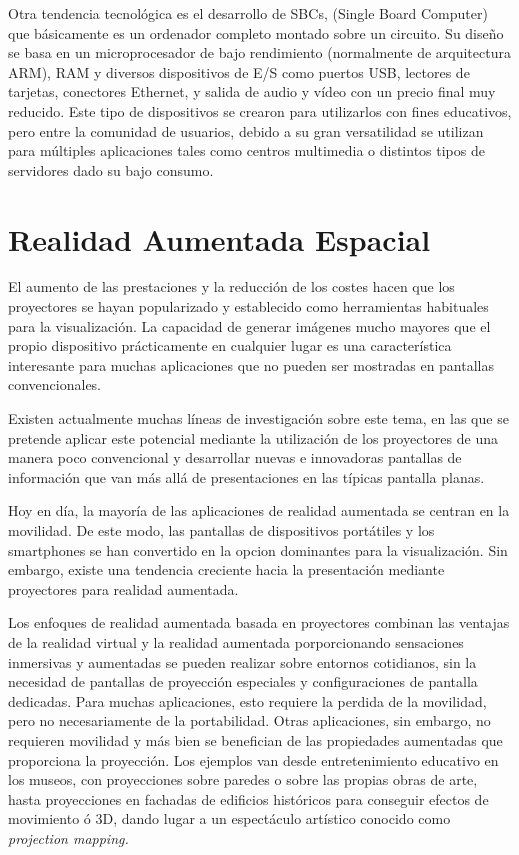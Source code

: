 Otra tendencia tecnológica es el desarrollo de SBCs, (Single Board Computer) que básicamente es un ordenador completo montado sobre un circuito. Su diseño se basa en un microprocesador de bajo rendimiento (normalmente de arquitectura ARM), RAM y diversos dispositivos de E/S como puertos USB, lectores de tarjetas, conectores Ethernet, y salida de audio y vídeo con un precio final muy reducido. Este tipo de dispositivos se crearon para utilizarlos con fines educativos, pero entre la comunidad de usuarios, debido a su gran versatilidad se utilizan para múltiples aplicaciones tales como centros multimedia o distintos tipos de servidores dado su bajo consumo.  

  \section{Realidad Aumentada Espacial}
  El aumento de las prestaciones y la reducción de los costes hacen que los proyectores se hayan popularizado y establecido como herramientas habituales para la visualización. La capacidad de generar imágenes mucho mayores que el propio dispositivo prácticamente en cualquier lugar es una característica interesante para muchas aplicaciones que no pueden ser mostradas en pantallas convencionales. 

Existen actualmente muchas líneas de investigación sobre este tema, en las que se pretende aplicar este potencial mediante la utilización de los proyectores de una manera poco convencional y desarrollar nuevas e innovadoras pantallas de información que van más allá de presentaciones en las típicas pantalla planas.
 

Hoy en día, la mayoría de las aplicaciones de realidad aumentada se centran en la movilidad. De este modo, las pantallas de dispositivos portátiles y los smartphones se han convertido en la opcion dominantes para la visualización. Sin embargo, existe una tendencia creciente hacia la presentación mediante proyectores para realidad aumentada. 

Los enfoques de realidad aumentada basada en proyectores combinan las ventajas de la realidad virtual y la realidad aumentada porporcionando sensaciones inmersivas y aumentadas se pueden realizar sobre entornos cotidianos, sin la necesidad de pantallas de proyección especiales y configuraciones de pantalla dedicadas. Para muchas aplicaciones, esto requiere la perdida de la movilidad, pero no necesariamente de la portabilidad. Otras aplicaciones, sin embargo, no requieren movilidad y más bien se benefician de las propiedades aumentadas que proporciona la proyección. Los ejemplos van desde entretenimiento educativo en los museos, con proyecciones sobre paredes o sobre las propias obras de arte, hasta proyecciones en fachadas de edificios históricos para conseguir efectos de movimiento ó 3D, dando lugar a un espectáculo artístico conocido como \emph{projection mapping.}
  
